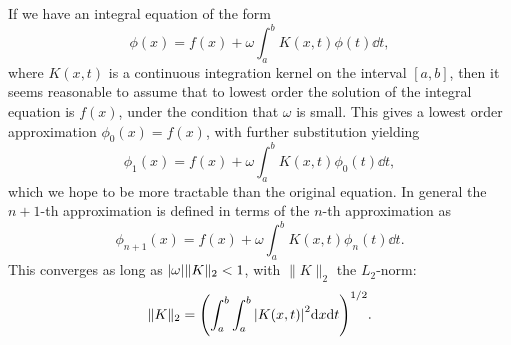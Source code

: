 \documentclass[11pt, a4paper]{report} %
\begin{document}
If we have an integral equation of the form
\begin{equation}
  \phi(x) = f(x) + \omega \int_{a}^b K(x,t)\phi(t) \dd t,
\end{equation}
where $K(x,t)$ is a continuous integration kernel on the interval $[a,b]$, then it seems reasonable to assume that to lowest order the solution of the integral equation is $f(x)$, under the condition that $\omega$ is small.
This gives a lowest order approximation $\phi_0(x) = f(x)$, with further substitution yielding 
\begin{equation}
  \phi_1(x) = f(x) + \omega \int_{a}^b K(x,t)\phi_0(t) \dd t,
\end{equation}
which we hope to be more tractable than the original equation.
In general the $n+1$-th approximation is defined in terms of the $n$-th approximation as
\begin{equation}
  \phi_{n+1}(x) = f(x) + \omega \int_{a}^b K(x,t)\phi_n(t) \dd t.
\end{equation}
This converges as long as $\abs{\omega} \lVert K \rVert_2 < 1$, with $\lVert K \rVert_2$ the $L_2$-norm:
\begin{equation}
  \lVert K \rVert_2 = {\qty( \int_{a}^b \int_a^b \abs{K(x,t)}^2 \dd x \dd t)}^{1/2}.
\end{equation}
\end{document}

